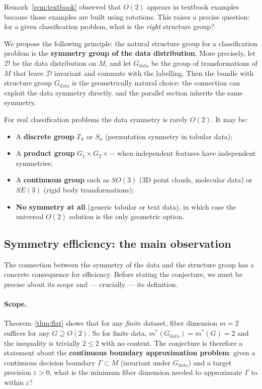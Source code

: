 \documentclass[11pt, a4paper]{article}
\theoremstyle{plain}
\theoremstyle{definition}
\newcommand{\Gam}{\Gamma}
\begin{document}
Remark~\ref{rem:textbook} observed that $O(2)$ appears in textbook examples
because those examples are built using rotations. This raises a precise question:
for a given classification problem, what is the \emph{right} structure group?

We propose the following principle: the natural structure group for a classification
problem is the \textbf{symmetry group of the data distribution}. More precisely,
let $\mathcal{D}$ be the data distribution on $M$, and let $G_{\mathrm{data}}$ be
the group of transformations of $M$ that leave $\mathcal{D}$ invariant and commute
with the labelling. Then the bundle with structure group $G_{\mathrm{data}}$ is
the geometrically natural choice: the connection can exploit the data symmetry
directly, and the parallel section inherits the same symmetry.

For real classification problems the data symmetry is rarely $O(2)$. It may be:
\begin{itemize}[itemsep=2pt]
  \item A \textbf{discrete group} $\mathbb{Z}_k$ or $S_n$ (permutation symmetry
        in tabular data);
  \item A \textbf{product group} $G_1 \times G_2 \times \cdots$ when independent
        features have independent symmetries;
  \item A \textbf{continuous group} such as $SO(3)$ (3D point clouds, molecular
        data) or $SE(3)$ (rigid body transformations);
  \item \textbf{No symmetry at all} (generic tabular or text data), in which case
        the universal $O(2)$ solution is the only geometric option.
\end{itemize}

\subsection{Symmetry efficiency: the main observation}

The connection between the symmetry of the data and the structure group has a
concrete consequence for efficiency. Before stating the conjecture, we must be
precise about its scope and — crucially — its definition.

\paragraph{Scope.}
Theorem~\ref{thm:flat} shows that for any \emph{finite} dataset, fiber dimension
$m = 2$ suffices for any $G \supseteq O(2)$. So for finite data,
$m^*(G_{\mathrm{data}}) = m^*(G) = 2$ and the inequality is trivially $2 \leq 2$
with no content. The conjecture is therefore a statement about the
\textbf{continuous boundary approximation problem}: given a continuous decision
boundary $\Gam \subset M$ (invariant under $G_{\mathrm{data}}$) and a target
precision $\varepsilon > 0$, what is the minimum fiber dimension needed to
approximate $\Gam$ to within $\varepsilon$?
\end{document}
